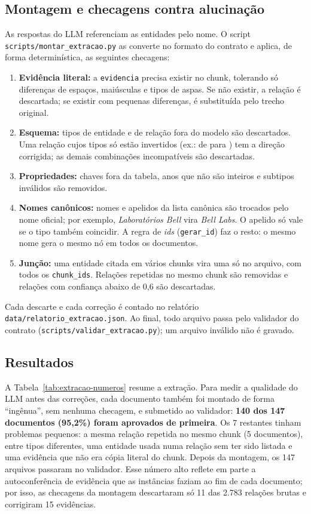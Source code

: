 \subsection{Montagem e checagens contra alucinação}

As respostas do LLM referenciam as entidades pelo nome. O script \texttt{scripts/montar\_extracao.py} as converte no formato do contrato e aplica, de forma determinística, as seguintes checagens:
\begin{enumerate}
  \item \textbf{Evidência literal:} a \texttt{evidencia} precisa existir no chunk, tolerando só diferenças de espaços, maiúsculas e tipos de aspas. Se não existir, a relação é descartada; se existir com pequenas diferenças, é substituída pelo trecho original.
  \item \textbf{Esquema:} tipos de entidade e de relação fora do modelo são descartados. Uma relação cujos tipos só estão invertidos (ex.:  de  para ) tem a direção corrigida; as demais combinações incompatíveis são descartadas.
  \item \textbf{Propriedades:} chaves fora da tabela, anos que não são inteiros e subtipos inválidos são removidos.
  \item \textbf{Nomes canônicos:} nomes e apelidos da lista canônica são trocados pelo nome oficial; por exemplo, \emph{Laboratórios Bell} vira \emph{Bell Labs}. O apelido só vale se o tipo também coincidir. A regra de \emph{ids} (\texttt{gerar\_id}) faz o resto: o mesmo nome gera o mesmo nó em todos os documentos.
  \item \textbf{Junção:} uma entidade citada em vários chunks vira uma só no arquivo, com todos os \texttt{chunk\_ids}. Relações repetidas no mesmo chunk são removidas e relações com confiança abaixo de 0,6 são descartadas.
\end{enumerate}
Cada descarte e cada correção é contado no relatório \texttt{data/relatorio\_extracao.json}. Ao final, todo arquivo passa pelo validador do contrato (\texttt{scripts/validar\_extracao.py}); um arquivo inválido não é gravado.

\subsection{Resultados}

A Tabela~\ref{tab:extracao-numeros} resume a extração. Para medir a qualidade do LLM antes das correções, cada documento também foi montado de forma ``ingênua'', sem nenhuma checagem, e submetido ao validador: \textbf{140 dos 147 documentos (95,2\%) foram aprovados de primeira}. Os 7 restantes tinham problemas pequenos: a mesma relação repetida no mesmo chunk (5 documentos),  entre tipos diferentes, uma entidade usada numa relação sem ter sido listada e uma evidência que não era cópia literal do chunk. Depois da montagem, os 147 arquivos passaram no validador. Esse número alto reflete em parte a autoconferência de evidência que as instâncias faziam ao fim de cada documento; por isso, as checagens da montagem descartaram só 11 das 2.783 relações brutas e corrigiram 15 evidências.

